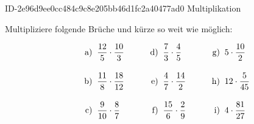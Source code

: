 \begin{exercise}
      {ID-2e96d9ee0cc484c9c8e205bb46d1fc2a40477ad0}
      {Multiplikation}
  \ifproblem\problem\par
    Multipliziere folgende Brüche und kürze so weit
    wie möglich:
    \newcommand{\no}[1]
    {%
      \vphantom{\Bigg(}%
      \makebox[3em][r]%
      {%
        #1)%
      }%
      \;\;&%
    }%
    \begin{align*}
      \no{a} \frac{12}{5}\cdot\frac{10}{3}  & \no{d} \frac{7}{3}\cdot\frac{4}{5}  & \no{g} 5\cdot\frac{10}{2}  \\
      \no{b} \frac{11}{8}\cdot\frac{18}{12} & \no{e} \frac{4}{7}\cdot\frac{14}{2} & \no{h} 12\cdot\frac{5}{45} \\
      \no{c} \frac{9}{10}\cdot\frac{8}{7}   & \no{f} \frac{15}{6}\cdot\frac{2}{9} & \no{i} 4\cdot\frac{81}{27}
    \end{align*}
  \fi
\end{exercise}
